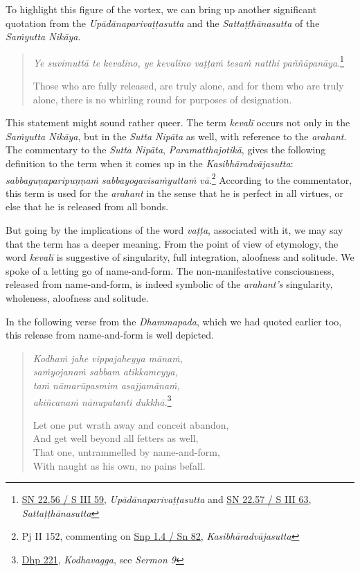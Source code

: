 To highlight this figure of the vortex, we can bring up another significant quotation from the \emph{Upādānaparivaṭṭasutta} and the \emph{Sattaṭṭhānasutta} of the \emph{Saṁyutta Nikāya}.

\begin{quote}
\emph{Ye suvimuttā te kevalino, ye kevalino vaṭṭaṁ tesaṁ natthi paññāpanāya}.\footnote{\href{https://suttacentral.net/sn22.56/pli/ms}{SN 22.56 / S III 59}, \emph{Upādānaparivaṭṭasutta} and \href{https://suttacentral.net/sn22.57/pli/ms}{SN 22.57 / S III 63}, \emph{Sattaṭṭhānasutta}}

Those who are fully released, are truly alone, and for them who are truly alone, there is no whirling round for purposes of designation.
\end{quote}

This statement might sound rather queer. The term \emph{kevalī} occurs not only in the \emph{Saṁyutta Nikāya}, but in the \emph{Sutta Nipāta} as well, with reference to the \emph{arahant}. The commentary to the \emph{Sutta Nipāta}, \emph{Paramatthajotikā}, gives the following definition to the term when it comes up in the \emph{Kasibhāradvājasutta}: \emph{sabbaguṇaparipuṇṇaṁ sabbayogavisaṁyuttaṁ vā}.\footnote{Pj II 152, commenting on \href{https://suttacentral.net/snp1.4/pli/ms}{Snp 1.4 / Sn 82}, \emph{Kasibhāradvājasutta}} According to the commentator, this term is used for the \emph{arahant} in the sense that he is perfect in all virtues, or else that he is released from all bonds.

But going by the implications of the word \emph{vaṭṭa}, associated with it, we may say that the term has a deeper meaning. From the point of view of etymology, the word \emph{kevalī} is suggestive of singularity, full integration, aloofness and solitude. We spoke of a letting go of name-and-form. The non-manifestative consciousness, released from name-and-form, is indeed symbolic of the \emph{arahant's} singularity, wholeness, aloofness and solitude.

In the following verse from the \emph{Dhammapada}, which we had quoted earlier too, this release from name-and-form is well depicted.

\begin{quote}
\emph{Kodhaṁ jahe vippajaheyya mānaṁ,}\\
\emph{saṁyojanaṁ sabbam atikkameyya,}\\
\emph{taṁ nāmarūpasmim asajjamānaṁ,}\\
\emph{akiñcanaṁ nānupatanti dukkhā.}\footnote{\href{https://suttacentral.net/dhp221-234/pli/ms}{Dhp 221}, \emph{Kodhavagga}, see \emph{Sermon 9}}

Let one put wrath away and conceit abandon,\\
And get well beyond all fetters as well,\\
That one, untrammelled by name-and-form,\\
With naught as his own, no pains befall.
\end{quote}

